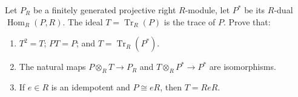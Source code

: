 Let $P_R$ be a finitely generated projective right $R$-module, let $P^*$ be its $R$-dual $\operatorname{Hom}_R(P, R)$. The ideal $T = \operatorname{Tr}_R(P)$ is the trace of $P$. Prove that:
\begin{enumerate}
    \item[(1)] $T^2 = T$; $PT = P$; and $T = \operatorname{Tr}_R(P^*)$.
    \item[(2)] The natural maps $P \otimes_R T \to P_R$ and $T \otimes_R P^* \to P^*$ are isomorphisms.
    \item[(3)] If $e \in R$ is an idempotent and $P \cong eR$, then $T = ReR$.
\end{enumerate}
